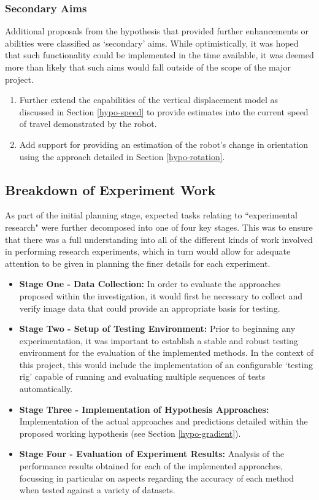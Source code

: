 \subsubsection{Secondary Aims}

Additional proposals from the hypothesis that provided further enhancements or abilities were classified as `secondary' aims. While optimistically, it was hoped that such functionality could be implemented in the time available, it was deemed more than likely that such aims would fall outside of the scope of the major project.

\begin{enumerate}
	 \item Further extend the capabilities of the vertical displacement model as discussed in Section \ref{hypo-speed} to provide estimates into the current speed of travel demonstrated by the robot.
	 \item Add support for providing an estimation of the robot's change in orientation using the approach detailed in Section \ref{hypo-rotation}.
\end{enumerate}

\subsection{Breakdown of Experiment Work}

As part of the initial planning stage, expected tasks relating to ``experimental research" were further decomposed into one of four key stages. This was to ensure that there was a full understanding into all of the different kinds of work involved in performing research experiments, which in turn would allow for adequate attention to be given in planning the finer details for each experiment. 

\begin{itemize}
	\item \textbf{Stage One - Data Collection:} In order to evaluate the approaches proposed within the investigation, it would first be necessary to collect and verify image data that could provide an appropriate basis for testing.
	\item \textbf{Stage Two - Setup of Testing Environment:} Prior to beginning any experimentation, it was important to establish a stable and robust testing environment for the evaluation of the implemented methods. In the context of this project, this would include the implementation of an configurable `testing rig' capable of running and evaluating multiple sequences of tests automatically.
	\item \textbf{Stage Three - Implementation of Hypothesis Approaches:} Implementation of the actual approaches and predictions detailed within the proposed working hypothesis (see Section \ref{hypo-gradient}).
	\item \textbf{Stage Four - Evaluation of Experiment Results:} Analysis of the performance results obtained for each of the implemented approaches, focussing in particular on aspects regarding the accuracy of each method when tested against a variety of datasets.
\end{itemize}  


